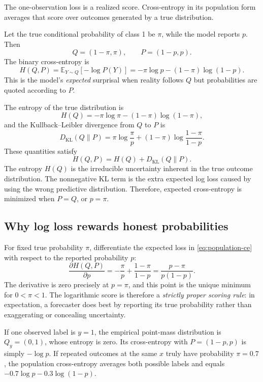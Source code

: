 \documentclass[11pt]{article}
\newcommand{\E}{\mathbb{E}}
\newcommand{\KL}{D_{\mathrm{KL}}}
\theoremstyle{definition}
\begin{document}
The one-observation loss is a realized score. Cross-entropy in its population form averages that score over outcomes generated by a true distribution.

Let the true conditional probability of class 1 be $\pi$, while the model reports $p$. Then
\[
Q=(1-\pi,\pi),
\qquad
P=(1-p,p).
\]
The binary cross-entropy is
\begin{equation}
H(Q,P)
=\E_{Y\sim Q}[-\log P(Y)]
=-\pi\log p-(1-\pi)\log(1-p).
\label{eq:population-ce}
\end{equation}
This is the model's \emph{expected} surprisal when reality follows $Q$ but probabilities are quoted according to $P$.

The entropy of the true distribution is
\begin{equation}
H(Q)=-\pi\log\pi-(1-\pi)\log(1-\pi),
\label{eq:entropy}
\end{equation}
and the Kullback--Leibler divergence from $Q$ to $P$ is
\begin{equation}
\KL(Q\|P)
=\pi\log\frac{\pi}{p}
+(1-\pi)\log\frac{1-\pi}{1-p}.
\label{eq:kl}
\end{equation}
These quantities satisfy
\begin{equation}
\boxed{H(Q,P)=H(Q)+\KL(Q\|P).}
\label{eq:ce-decomposition}
\end{equation}
The entropy $H(Q)$ is the irreducible uncertainty inherent in the true outcome distribution. The nonnegative KL term is the extra expected log loss caused by using the wrong predictive distribution. Therefore, expected cross-entropy is minimized when $P=Q$, or $p=\pi$.

\subsection{Why log loss rewards honest probabilities}

For fixed true probability $\pi$, differentiate the expected loss in \cref{eq:population-ce} with respect to the reported probability $p$:
\[
\frac{\partial H(Q,P)}{\partial p}
=-\frac{\pi}{p}+\frac{1-\pi}{1-p}
=\frac{p-\pi}{p(1-p)}.
\]
The derivative is zero precisely at $p=\pi$, and this point is the unique minimum for $0<\pi<1$. The logarithmic score is therefore a \emph{strictly proper scoring rule}: in expectation, a forecaster does best by reporting its true probability rather than exaggerating or concealing uncertainty.

\begin{examplebox}
If one observed label is $y=1$, the empirical point-mass distribution is $Q_y=(0,1)$, whose entropy is zero. Its cross-entropy with $P=(1-p,p)$ is simply $-\log p$. If repeated outcomes at the same $x$ truly have probability $\pi=0.7$, the population cross-entropy averages both possible labels and equals $-0.7\log p-0.3\log(1-p)$.
\end{examplebox}
\end{document}
